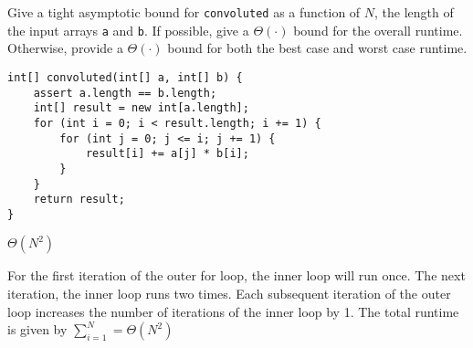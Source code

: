 \begin{blocksection}
\question Give a tight asymptotic bound for \lstinline$convoluted$ as a
function of $N$, the length of the input arrays \lstinline$a$ and
\lstinline$b$. If possible, give a $\Theta(\cdot)$ bound for the overall
runtime. Otherwise, provide a $\Theta(\cdot)$ bound for both the best case and
worst case runtime.

\begin{lstlisting}
int[] convoluted(int[] a, int[] b) {
    assert a.length == b.length;
    int[] result = new int[a.length];
    for (int i = 0; i < result.length; i += 1) {
        for (int j = 0; j <= i; j += 1) {
            result[i] += a[j] * b[i];
        }
    }
    return result;
}
\end{lstlisting}

\begin{solution}[0.5in]
$\Theta(N^2)$

For the first iteration of the outer for loop, the inner loop will run once. The next iteration, the inner loop runs two times. Each subsequent iteration of the outer loop increases the number of iterations of the inner loop by 1. The total runtime is given by $\sum_{i=1}^N = \Theta(N^2)$
\end{solution}
\end{blocksection}
